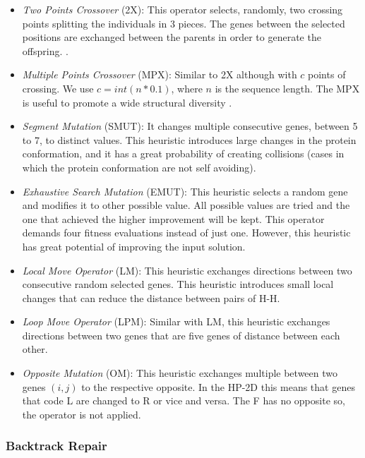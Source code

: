 \documentclass[conference]{IEEEtran}
\begin{document}
  \begin{itemize}
  	\item \textit{Two Points Crossover} (2X): This operator selects, randomly, two crossing points splitting the individuals in 3 pieces. The genes between the selected positions are exchanged between the parents in order to generate the offspring. \cite{benitez2015algoritmo}.
  	
  	
  	\item  \textit{Multiple Points Crossover} (MPX): Similar to 2X although with $c$ points of crossing. We use $c=int(n*0.1)$, where $n$ is the sequence length. The MPX is useful to promote a wide structural diversity \cite{sabar2015automatic}.
  	
	\item \textit{Segment Mutation} (SMUT): It changes multiple consecutive genes, between 5 to 7, to distinct values. This heuristic introduces large changes in the protein conformation, and it has a great probability of creating collisions (cases in which the protein conformation are not self avoiding).  

	\item \textit {Exhaustive Search Mutation} (EMUT): 	This heuristic selects a random gene and modifies it to other possible value. All possible values are tried and the one that achieved the higher improvement will be kept. This operator demands four fitness evaluations instead of just one. However, this heuristic has great potential of improving the input solution.
	
	\item \textit{Local Move Operator} (LM): This heuristic exchanges directions between two consecutive random selected genes. This heuristic introduces small local changes that can reduce the distance between pairs of H-H.
	
	\item \textit{Loop Move Operator} (LPM): Similar with LM, this heuristic exchanges directions between two genes that are five genes of distance between each other.
	
	
	\item \textit{Opposite Mutation} (OM): This heuristic exchanges multiple between two genes $(i,j)$ to the respective opposite. In the HP-2D this means that genes that code L are changed to R or vice and versa. The F has no opposite so, the operator is not applied. 

 \end{itemize} 	 
 
 \subsubsection{Backtrack Repair}
\end{document}

